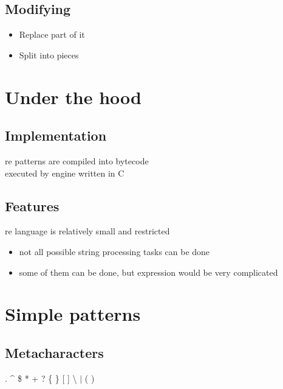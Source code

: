 \documentclass{beamer}
\begin{document}
\subsection{Modifying}
\begin{frame}
\begin{itemize}
\item Replace part of it
\item Split into pieces
\end{itemize}
\end{frame}

\section{Under the hood}
\subsection{Implementation}
\begin{frame}
re patterns are compiled into bytecode \\
\pause
executed by engine written in C
\end{frame}

\subsection{Features}
\begin{frame}
re language is relatively small and restricted
\pause
 \begin{itemize}
  \item not all possible string processing tasks can be done
  \item some of them can be done, but expression would be very complicated
 \end{itemize}
\end{frame}

\section{Simple patterns}
\subsection{Metacharacters}
\begin{frame}
. \textasciicircum{} \$ * + ? \{ \} [ ] \textbackslash{} $\vert$ ( )
\end{frame}
\end{document}
